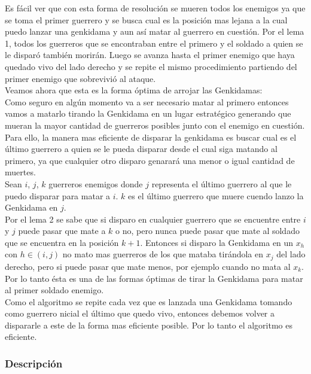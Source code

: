 		Es fácil ver que con esta forma de resolución se mueren todos los enemigos ya que se toma el primer guerrero y se busca cual es la posición mas lejana a la cual puedo lanzar una genkidama y aun así matar al guerrero en cuestión. Por el lema 1, todos los guerreros que se encontraban entre el primero y el soldado a quien se le disparó también morirán. Luego se avanza hasta el primer enemigo que haya quedado vivo del lado derecho y se repite el mismo procedimiento partiendo del primer enemigo que sobrevivió al ataque. \\ 


		Veamos ahora que esta es la forma óptima de arrojar las Genkidamas:\\


		Como seguro en algún momento va a ser necesario matar al primero entonces vamos a matarlo tirando la Genkidama en un lugar estratégico generando que mueran la mayor cantidad de guerreros posibles junto con el enemigo en cuestión. Para ello, la manera mas eficiente de disparar la genkidama es buscar cual es el último guerrero a quien se le pueda disparar desde el cual siga matando al primero, ya que cualquier otro disparo genarará una menor o igual cantidad de muertes.\\
		Sean $i$, $j$, $k$ guerreros enemigos donde $j$ representa el último guerrero al que le puedo disparar para matar a $i$. $k$ es el último guerrero que muere cuendo lanzo la Genkidama en $j$.\\
		Por el lema 2 se sabe que si disparo en cualquier guerrero que se encuentre entre $i$ y $j$ puede pasar que mate a $k$ o no, pero nunca puede pasar que mate al soldado que se encuentra en la posición $k+1$. Entonces si disparo la Genkidama en un $x_{h}$ con $h \in (i, j)$ no mato mas guerreros de los que mataba tirándola en $x_{j}$ del lado derecho, pero si puede pasar que mate menos, por ejemplo cuando no mata al $x_{k}$.\\
		Por lo tanto ésta es una de las formas óptimas de tirar la Genkidama para matar al primer soldado enemigo.\\
		Como el algoritmo se repite cada vez que es lanzada una Genkidama tomando como guerrero nicial el último que quedo vivo, entonces debemos volver a dispararle a este de la forma mas eficiente posible. Por lo tanto el algoritmo es eficiente.  \\

		\subsubsection*{Descripción}
		 
